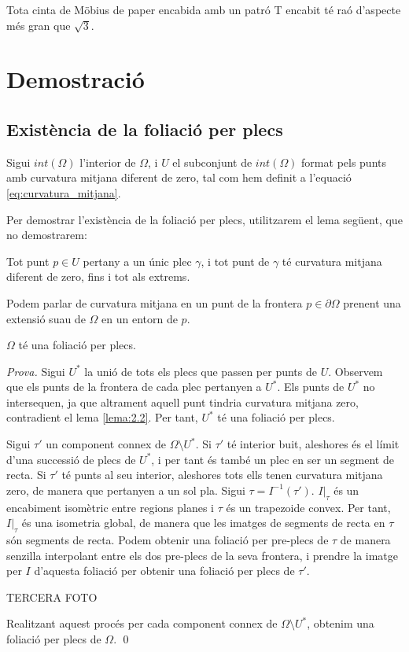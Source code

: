 \begin{lema}[\textbf{G}]\label{lema G}
    Tota cinta de Möbius de paper encabida amb un patró T encabit té raó d'aspecte més gran que $\sqrt{3}$.
\end{lema}

\section{Demostració}
\subsection{Existència de la foliació per plecs}
Sigui $int(\Omega)$ l'interior de $\Omega$, i $U$ el subconjunt de $int(\Omega)$ format pels punts amb curvatura mitjana diferent de zero, tal com hem definit a l'equació \eqref{eq:curvatura_mitjana}.

Per demostrar l'existència de la foliació per plecs, utilitzarem el lema següent, que no demostrarem:
\begin{lema}\label{lema:2.2}
    Tot punt $p\in U$ pertany a un únic plec $\gamma$, i tot punt de $\gamma$ té curvatura mitjana diferent de zero, fins i tot als extrems.
\end{lema}
Podem parlar de curvatura mitjana en un punt de la frontera $p\in\partial \Omega$ prenent una extensió suau de $\Omega$ en un entorn de $p$.

\begin{teo}\label{teo:existencia_foliacio_plecs}
    $\Omega$ té una foliació per plecs.
\end{teo}
{
    \color{green!50!black}
    \textit{Prova.}
    Sigui $U^*$ la unió de tots els plecs que passen per punts de $U$. Observem que els punts de la frontera de cada plec pertanyen a $U^*$. Els punts de $U^*$ no intersequen, ja que altrament aquell punt tindria curvatura mitjana zero, contradient el lema \ref{lema:2.2}. Per tant, $U^*$ té una foliació per plecs. 

    Sigui $\tau'$ un component connex de $\Omega\setminus U^*$.
    Si $\tau'$ té interior buit, aleshores és el límit d'una successió de plecs de $U^*$, i per tant és també un plec en ser un segment de recta.
    Si $\tau'$ té punts al seu interior, aleshores tots ells tenen curvatura mitjana zero, de manera que pertanyen a un sol pla.
    Sigui $\tau = I^{-1}(\tau')$. $I|_{\tau}$ és un encabiment isomètric entre regions planes i $\tau$ és un trapezoide convex. Per tant, $I|_{\tau}$ és una isometria global, de manera que les imatges de segments de recta en $\tau$ són segments de recta. Podem obtenir una foliació per pre-plecs de $\tau$ de manera senzilla interpolant entre els dos pre-plecs de la seva frontera, i prendre la imatge per $I$ d'aquesta foliació per obtenir una foliació per plecs de $\tau'$.
    
    {\color{blue} TERCERA FOTO}

    Realitzant aquest procés per cada component connex de $\Omega\setminus U^*$, obtenim una foliació per plecs de $\Omega$.
    \qed
}
